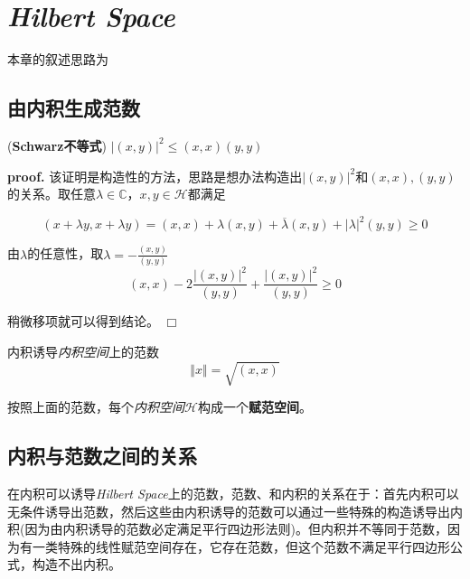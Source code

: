 \chapter{\textsl{Hilbert Space}}

本章的叙述思路为

\section{由内积生成范数}

\begin{mdframed}
    \begin{lemma}
        (\textbf{Schwarz不等式})  $\left| (x,y) \right|^2\leqslant (x,x)(y,y)$
    \end{lemma}
\end{mdframed}

\textbf{proof.} 该证明是构造性的方法，思路是想办法构造出$\left|(x,y)\right|^2$和$(x,x),(y,y)$的关系。取任意$\lambda\in \mathbb{C}$，$x,y\in \mathcal{H}$都满足

\begin{equation}
    (x+\lambda y,x+\lambda y)=(x,x)+\lambda(x,y)+\overline{\lambda}(x,y)+|\lambda|^2(y,y)\geqslant 0
\end{equation}

由$\lambda$的任意性，取$\lambda=-\displaystyle\frac{(x,y)}{(y,y)}$
\begin{equation}
    (x,x)-2\displaystyle\frac{|(x,y)|^2}{(y,y)}+\displaystyle\frac{|(x,y)|^2}{(y,y)}\geqslant 0
\end{equation}

稍微移项就可以得到结论。 $\Box$

\begin{mdframed}
    \begin{theorem}
        内积诱导\textsl{内积空间}上的范数
        \begin{equation}
            \Vert x\Vert=\sqrt{(x,x)}
        \end{equation}

        按照上面的范数，每个\textsl{内积空间}$\mathcal{H}$构成一个\textbf{赋范空间}。
    \end{theorem}
\end{mdframed}
 
\section{内积与范数之间的关系}

在内积可以诱导\textsl{Hilbert Space}上的范数，范数、和内积的关系在于：首先内积可以无条件诱导出范数，然后这些由内积诱导的范数可以通过一些特殊的构造诱导出内积(因为由内积诱导的范数必定满足平行四边形法则)。但内积并不等同于范数，因为有一类特殊的线性赋范空间存在，它存在范数，但这个范数不满足平行四边形公式，构造不出内积。

